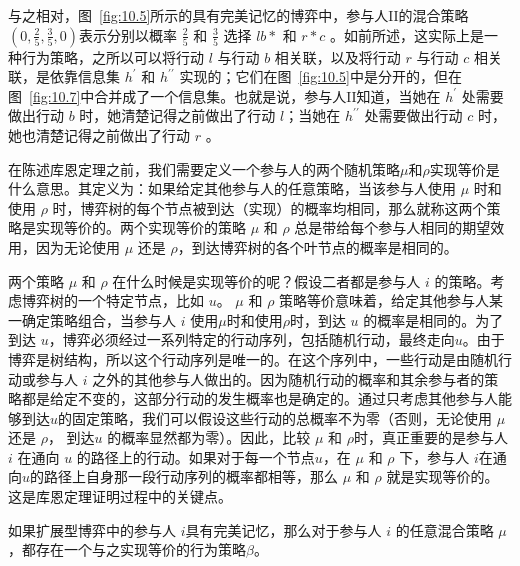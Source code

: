 与之相对，图~\ref{fig:10.5}所示的具有完美记忆的博弈中，参与人$\mathrm{II}$的混合策略 \(\left( {0,\frac{2}{5},\frac{3}{5},0}\right)\)表示分别以概率 \(\frac{2}{5}\) 和 \(\frac{3}{5}\) 选择 \({lb} *\) 和 \(r * c\) 。如前所述，这实际上是一种行为策略，之所以可以将行动 \(l\) 与行动 \(b\) 相关联，以及将行动 \(r\) 与行动 \(c\) 相关联，是依靠信息集 \({h}^{\prime }\) 和 \({h}^{\prime \prime }\) 实现的；它们在图~\ref{fig:10.5}中是分开的，但在图~\ref{fig:10.7}中合并成了一个信息集。也就是说，参与人$\mathrm{II}$知道，当她在 \({h}^{\prime }\) 处需要做出行动 \(b\) 时，她清楚记得之前做出了行动 \(l\)；当她在 \({h}^{\prime \prime }\) 处需要做出行动 \(c\) 时，她也清楚记得之前做出了行动 \(r\) 。

在陈述库恩定理之前，我们需要定义一个参与人的两个随机策略\(\mu\)和\(\rho\)实现等价是什么意思。其定义为：如果给定其他参与人的任意策略，当该参与人使用 \(\mu\) 时和使用 \(\rho\) 时，博弈树的每个节点被到达（实现）的概率均相同，那么就称这两个策略是实现等价的。两个实现等价的策略 \(\mu\) 和 \(\rho\) 总是带给每个参与人相同的期望效用，因为无论使用 \(\mu\) 还是 \(\rho\)，到达博弈树的各个叶节点的概率是相同的。

两个策略 \(\mu\) 和 \(\rho\) 在什么时候是实现等价的呢？假设二者都是参与人 \(i\) 的策略。考虑博弈树的一个特定节点，比如 \(u\)。 \(\mu\) 和 \(\rho\) 策略等价意味着，给定其他参与人某一确定策略组合，当参与人 \(i\) 使用\(\mu\)时和使用\(\rho\)时，到达 \(u\) 的概率是相同的。为了到达 \(u\)，博弈必须经过一系列特定的行动序列，包括随机行动，最终走向\(u\)。由于博弈是树结构，所以这个行动序列是唯一的。在这个序列中，一些行动是由随机行动或参与人 \(i\) 之外的其他参与人做出的。因为随机行动的概率和其余参与者的策略都是给定不变的，这部分行动的发生概率也是确定的。通过只考虑其他参与人能够到达\(u\)的固定策略，我们可以假设这些行动的总概率不为零（否则，无论使用 \(\mu\) 还是 \(\rho\)， 到达\(u\) 的概率显然都为零）。因此，比较 \(\mu\) 和 \(\rho\)时，真正重要的是参与人 \(i\) 在通向 \(u\) 的路径上的行动。如果对于每一个节点\(u\)，在 \(\mu\) 和 \(\rho\) 下，参与人 \(i\)在通向\(u\)的路径上自身那一段行动序列的概率都相等，那么 \(\mu\) 和 \(\rho\) 就是实现等价的。这是库恩定理证明过程中的关键点。

\begin{theorem}
\label{theo:10.4}
如果扩展型博弈中的参与人 \(i\)具有完美记忆，那么对于参与人 \(i\) 的任意混合策略 \(\mu\)，都存在一个与之实现等价的行为策略\(\beta\)。
\end{theorem}

